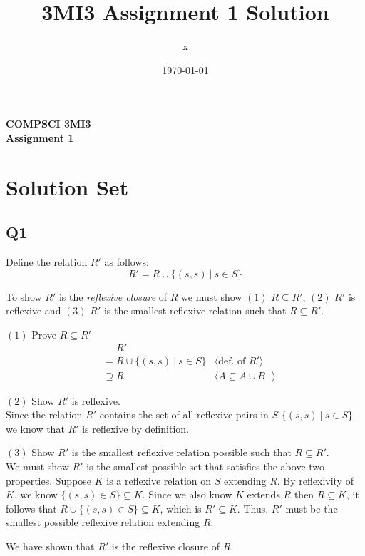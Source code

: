 \documentclass[12pt, fleqn]{article}
\title{3MI3 Assignment 1 Solution}
\author{x}
\date{\today}
\newcommand{\pnote}[1]{{\langle \text{#1} \rangle}}
\begin{document}
\begin{center}

    {\large \textbf{COMPSCI 3MI3}}\\[8mm]
    {\huge \textbf{Assignment 1}}\\[6mm]
\end{center}

\medskip

\section{Solution Set}

\subsection{Q1}

Define the relation $R'$ as follows:
$$R' = R \cup \{(s,s)~|~s \in S\}$$

\noindent
To show $R'$ is the \emph{reflexive closure} of $R$ we must show $(1)$ $R \subseteq R'$, $(2)$ $R'$ 
is reflexive and $(3)$ $R'$ is the smallest reflexive relation such that $R \subseteq R'$.

\medskip

$(1)$ Prove $R \subseteq R'$
\begin{align*}
    &\phantom{{}=} R' & \\
    &= R \cup \{ (s, s)~|~s \in S\} & \pnote{def. of $R'$} \\
    & \supseteq R & \pnote{$A \subseteq A \cup B$ }
\end{align*}

$(2)$ Show $R'$ is reflexive.\\
Since the relation $R'$ contains the set of all reflexive pairs in $S$
$\{ (s, s) ~|~ s \in S \}$ we know that $R'$ is reflexive by definition. 

\medskip

$(3)$ Show $R'$ is the smallest reflexive relation possible such that $R \subseteq R'$.\\
We must show $R'$ is the smallest possible set that satisfies the above two properties. 
Suppose $K$ is a reflexive relation on $S$ extending $R$. By reflexivity of $K$, we know $\{ (s, s) \in S \} \subseteq K$. 
Since we also know $K$ extends $R$ then $R \subseteq K$, it follows that $R \cup \{ (s, s) \in S \} \subseteq K$, which is $R' \subseteq K$. Thus, $R'$ must be the smallest possible reflexive relation extending $R$.

\medskip 
We have shown that $R'$ is the reflexive closure of $R$. 
\end{document}
